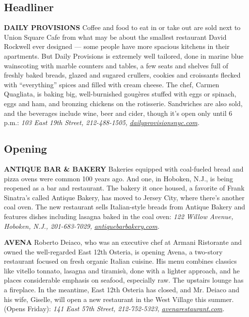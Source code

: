 \hypertarget{headliner}{%
\subsection{Headliner}\label{headliner}}

\textbf{DAILY PROVISIONS} Coffee and food to eat in or take out are sold
next to Union Square Cafe from what may be about the smallest restaurant
David Rockwell ever designed --- some people have more spacious kitchens
in their apartments. But Daily Provisions is extremely well tailored,
done in marine blue wainscoting with marble counters and tables, a few
seats and shelves full of freshly baked breads, glazed and sugared
crullers, cookies and croissants flecked with ``everything'' spices and
filled with cream cheese. The chef, Carmen Quagliata, is baking big,
well-burnished gougères stuffed with eggs or spinach, eggs and ham, and
bronzing chickens on the rotisserie. Sandwiches are also sold, and the
beverages include wine, beer and cider, though it's open only until 6
p.m.: \emph{103 East 19th Street, 212-488-1505,}
\href{http://www.dailyprovisionsnyc.com/}{\emph{dailyprovisionsnyc.com}}\emph{.}

\hypertarget{opening}{%
\subsection{Opening}\label{opening}}

\textbf{ANTIQUE BAR \& BAKERY} Bakeries equipped with coal-fueled bread
and pizza ovens were common 100 years ago. And one, in Hoboken, N.J., is
being reopened as a bar and restaurant. The bakery it once housed, a
favorite of Frank Sinatra's called Antique Bakery, has moved to Jersey
City, where there's another coal oven. The new restaurant sells
Italian-style breads from Antique Bakery and features dishes including
lasagna baked in the coal oven: \emph{122 Willow Avenue, Hoboken, N.J.,
201-683-7029,}
\href{http://antiquebarbakery.com/}{\emph{antiquebarbakery.com}}\emph{.}

\textbf{AVENA} Roberto Deiaco, who was an executive chef at Armani
Ristorante and owned the well-regarded East 12th Osteria, is opening
Avena, a two-story restaurant focused on fresh organic Italian cuisine.
His menu combines classics like vitello tonnato, lasagna and tiramisù,
done with a lighter approach, and he places considerable emphasis on
seafood, especially raw. The upstairs lounge has a fireplace. In the
meantime, East 12th Osteria has closed, and Mr. Deiaco and his wife,
Giselle, will open a new restaurant in the West Village this summer.
(Opens Friday): \emph{141 East 57th Street, 212-752-5323,}
\href{http://www.avenarestaurant.com/}{\emph{avenarestaurant.com}}\emph{.}

